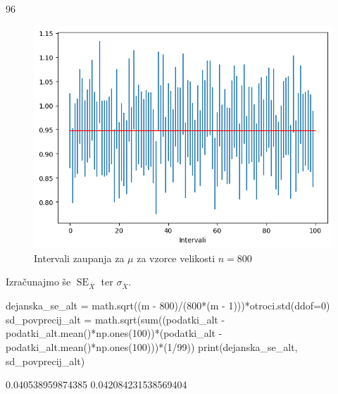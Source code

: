 \documentclass[10pt, a4paper]{article}
\DeclareMathOperator{\se}{SE}
\begin{document}
\begin{python}
    96
\end{python}

\begin{figure}[H]
    \centering
    \includegraphics[scale=0.75]{Images/1f.png}
    \caption{Intervali zaupanja za $\mu$ za vzorce velikosti $n = 800$}
\end{figure}

Izračunajmo še $\se_{\overline{X}}$ ter $\sigma_{\overline{X}}$.

\begin{python}
    dejanska_se_alt = math.sqrt((m - 800)/(800*(m - 1)))*otroci.std(ddof=0)
    sd_povprecij_alt = math.sqrt(sum((podatki_alt - podatki_alt.mean()*np.ones(100))*(podatki_alt - podatki_alt.mean()*np.ones(100)))*(1/99))
    print(dejanska_se_alt, sd_povprecij_alt)
\end{python}

\begin{python}
    0.040538959874385 0.042084231538569404
\end{python}
\end{document}

